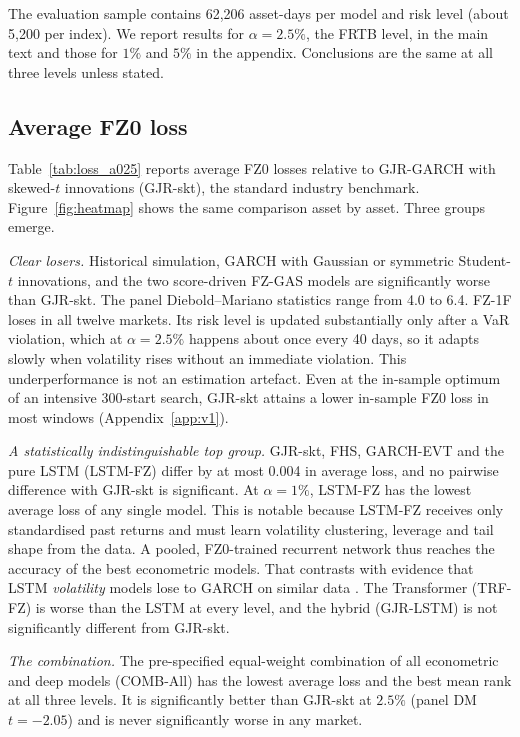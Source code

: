 The evaluation sample contains 62{,}206 asset-days per model and risk level (about 5{,}200 per index). We report results for $\alpha=2.5\%$, the FRTB level, in the main text and those for $1\%$ and $5\%$ in the appendix. Conclusions are the same at all three levels unless stated.

\subsection{Average FZ0 loss}
Table~\ref{tab:loss_a025} reports average FZ0 losses relative to GJR-GARCH with skewed-$t$ innovations (GJR-skt), the standard industry benchmark. Figure~\ref{fig:heatmap} shows the same comparison asset by asset. Three groups emerge.

\emph{Clear losers.} Historical simulation, GARCH with Gaussian or symmetric Student-$t$ innovations, and the two score-driven FZ-GAS models are significantly worse than GJR-skt. The panel Diebold--Mariano statistics range from 4.0 to 6.4. FZ-1F loses in all twelve markets. Its risk level is updated substantially only after a VaR violation, which at $\alpha=2.5\%$ happens about once every 40 days, so it adapts slowly when volatility rises without an immediate violation. This underperformance is not an estimation artefact. Even at the in-sample optimum of an intensive 300-start search, GJR-skt attains a lower in-sample FZ0 loss in most windows (Appendix~\ref{app:v1}).

\emph{A statistically indistinguishable top group.} GJR-skt, FHS, GARCH-EVT and the pure LSTM (LSTM-FZ) differ by at most 0.004 in average loss, and no pairwise difference with GJR-skt is significant. At $\alpha=1\%$, LSTM-FZ has the lowest average loss of any single model. This is notable because LSTM-FZ receives only standardised past returns and must learn volatility clustering, leverage and tail shape from the data. A pooled, FZ0-trained recurrent network thus reaches the accuracy of the best econometric models. That contrasts with evidence that LSTM \emph{volatility} models lose to GARCH on similar data \citep{amjad2026neural}. The Transformer (TRF-FZ) is worse than the LSTM at every level, and the hybrid (GJR-LSTM) is not significantly different from GJR-skt.

\emph{The combination.} The pre-specified equal-weight combination of all econometric and deep models (COMB-All) has the lowest average loss and the best mean rank at all three levels. It is significantly better than GJR-skt at $2.5\%$ (panel DM $t=-2.05$) and is never significantly worse in any market.


